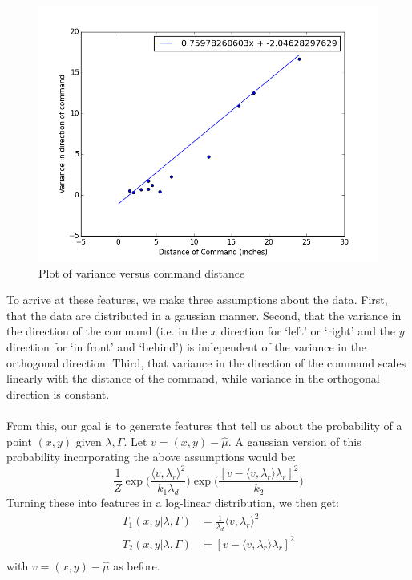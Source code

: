 \documentclass[12pt,letterpaper]{article}
\begin{document}
\begin{figure}[H]
\centering
\includegraphics[scale=0.5]{images/varplot.png}
\caption{Plot of variance versus command distance}
\label{fig:varplot}
\end{figure}

To arrive at these features, we make three assumptions about the data. First, that the data are distributed in a gaussian manner. Second, that the variance in the direction of the command (i.e. in the $x$ direction for `left' or `right' and the $y$ direction for `in front' and `behind') is independent of the variance in the orthogonal direction. Third, that variance in the direction of the command scales linearly with the distance of the command, while variance in the orthogonal direction is constant. \\
\\
From this, our goal is to generate features that tell us about the probability of a point $(x, y)$ given $\lambda, \Gamma$. Let $v = (x, y) - \hat{\mu}$. A gaussian version of this probability incorporating the above assumptions would be:
\[
\frac{1}{Z}\exp\bigg(\frac{\langle v, \lambda_r\rangle^2}{k_1 \lambda_d}\bigg)\exp\bigg(\frac{[v - \langle v, \lambda_r\rangle\lambda_r]^2}{k_2}\bigg)
\]
Turning these into features in a log-linear distribution, we then get:
\begin{equation*}
\begin{split}
T_1(x, y | \lambda, \Gamma) &= \frac{1}{\lambda_d} \langle v, \lambda_r \rangle^2 \\
T_2(x, y | \lambda, \Gamma) &= [v - \langle v, \lambda_r \rangle\lambda_r]^2 \\
\end{split}
\end{equation*}
with $v = (x, y) - \hat{\mu}$ as before.
\end{document}
